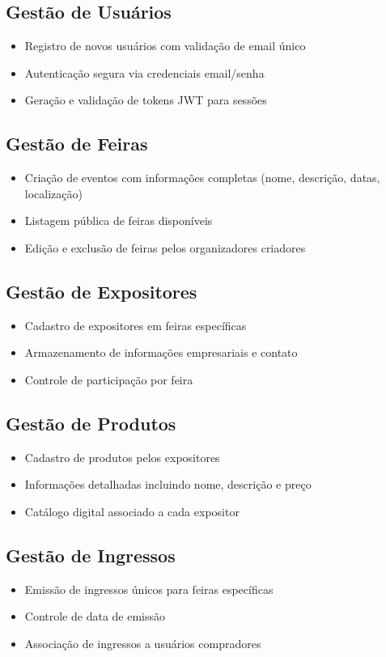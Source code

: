 \documentclass[12pt,a4paper]{article}
\begin{document}
\subsection{Gestão de Usuários}
\begin{itemize}
    \item Registro de novos usuários com validação de email único
    \item Autenticação segura via credenciais email/senha
    \item Geração e validação de tokens JWT para sessões
\end{itemize}

\subsection{Gestão de Feiras}
\begin{itemize}
    \item Criação de eventos com informações completas (nome, descrição, datas, localização)
    \item Listagem pública de feiras disponíveis
    \item Edição e exclusão de feiras pelos organizadores criadores
\end{itemize}

\subsection{Gestão de Expositores}
\begin{itemize}
    \item Cadastro de expositores em feiras específicas
    \item Armazenamento de informações empresariais e contato
    \item Controle de participação por feira
\end{itemize}

\subsection{Gestão de Produtos}
\begin{itemize}
    \item Cadastro de produtos pelos expositores
    \item Informações detalhadas incluindo nome, descrição e preço
    \item Catálogo digital associado a cada expositor
\end{itemize}

\subsection{Gestão de Ingressos}
\begin{itemize}
    \item Emissão de ingressos únicos para feiras específicas
    \item Controle de data de emissão
    \item Associação de ingressos a usuários compradores
\end{itemize}
\end{document}
